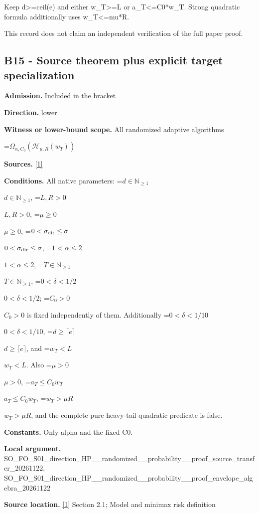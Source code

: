 \documentclass[10pt,a4paper]{article}
\newcommand{\AtlasMath}[1]{\par\begingroup\centering\setbox0=\hbox{$\displaystyle #1$}\ifdim\wd0>1.4\linewidth\typeout{ATLAS WIDE FORMULA: \the\wd0}\fi\ifdim\wd0>\linewidth\resizebox{\linewidth}{!}{\box0}\else\box0\fi\par\endgroup}
\newcommand{\AtlasInlineMath}[1]{\begingroup\setbox0=\hbox{$#1$}\ifdim\wd0>.4\linewidth\endgroup\AtlasMath{#1}\else\endgroup$#1$\fi}
\begin{document}
Keep d>=ceil(e) and either w\_T>=L or a\_T<=C0*w\_T. Strong quadratic formula additionally uses w\_T<=mu*R.



This record does not claim an independent verification of the full paper proof.



\subsection{B15 - Source theorem plus explicit target specialization}


\textbf{Admission.} Included in the bracket



\textbf{Direction.} lower



\textbf{Witness or lower-bound scope.} All randomized adaptive algorithms



\AtlasMath{\Omega_{\alpha,C_0}\!\left(\mathcal H_{\mu,R}(w_T)\right)}


\textbf{Sources.} \href{https://arxiv.org/html/2610.00260v2}{[1]}



\textbf{Conditions.} All native parameters: \AtlasInlineMath{d\in\mathbb N_{\ge1}}, \AtlasInlineMath{L,R>0}, \AtlasInlineMath{\mu\ge0}, \AtlasInlineMath{0<\sigma_{\rm dir}\le\sigma}, \AtlasInlineMath{1<\alpha\le2}, \AtlasInlineMath{T\in\mathbb N_{\ge1}}, \AtlasInlineMath{0<\delta<1/2}; \AtlasInlineMath{C_0>0} is fixed independently of them. Additionally \AtlasInlineMath{0<\delta<1/10}, \AtlasInlineMath{d\ge\lceil e\rceil}, and \AtlasInlineMath{w_T<L}. Also \AtlasInlineMath{\mu>0}, \AtlasInlineMath{a_T\le C_0w_T}, \AtlasInlineMath{w_T>\mu R}, and the complete pure heavy-tail quadratic predicate is false.



\textbf{Constants.} Only alpha and the fixed C0.



\textbf{Local argument.} SO\_FO\_S01\_direction\_HP\_\_\allowbreak{}randomized\_\_probability\_\allowbreak{}\_proof\_source\_transfer\_2\allowbreak{}0261122, SO\_FO\_S01\_direction\_HP\_\_\allowbreak{}randomized\_\_probability\_\allowbreak{}\_proof\_envelope\_algebra\_\allowbreak{}20261122



\textbf{Source location.} \href{https://arxiv.org/html/2610.00260v2}{[1]} Section 2.1; Model and minimax risk definition
\end{document}

